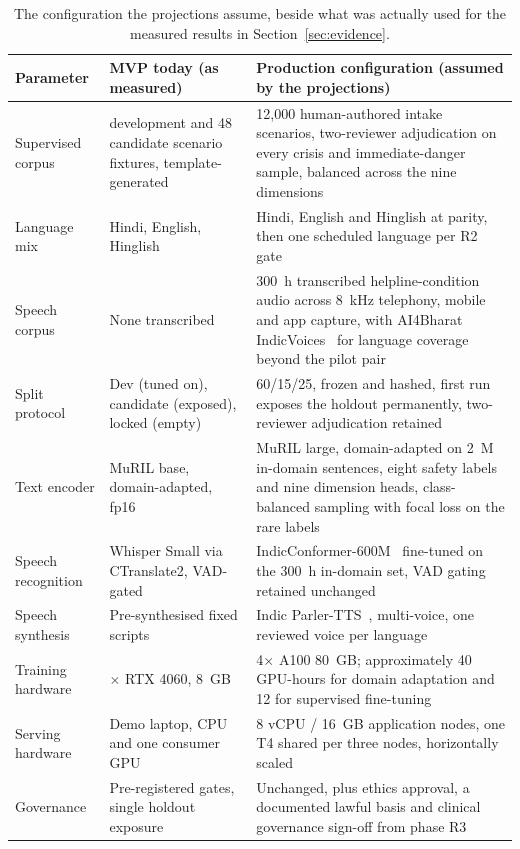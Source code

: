 \documentclass[11pt,a4paper]{article}
\begin{document}
\begin{table}[!htbp]
\centering\footnotesize
\caption{The configuration the projections assume, beside what was actually used for the measured
results in Section~\ref{sec:evidence}.}
\label{tab:trainconfig}
\begin{tabularx}{\linewidth}{@{}>{\raggedright\arraybackslash}p{2.9cm}>{\raggedright\arraybackslash}p{5.0cm}X@{}}
\toprule
Parameter & MVP today (as measured) & Production configuration (assumed by the projections) \\
\midrule
Supervised corpus & 57 development and 48 candidate scenario fixtures, template-generated &
12{,}000 human-authored intake scenarios, two-reviewer adjudication on every crisis and
immediate-danger sample, balanced across the nine dimensions \\
Language mix & Hindi, English, Hinglish & Hindi, English and Hinglish at parity, then one scheduled
language per R2 gate \\
Speech corpus & None transcribed & 300~h transcribed helpline-condition audio across 8~kHz
telephony, mobile and app capture, with AI4Bharat IndicVoices~\cite{indicvoices} for language
coverage beyond the pilot pair \\
Split protocol & Dev (tuned on), candidate (exposed), locked (empty) & 60/15/25, frozen and hashed,
first run exposes the holdout permanently, two-reviewer adjudication retained \\
Text encoder & MuRIL base, domain-adapted, fp16 & MuRIL large, domain-adapted on 2~M in-domain
sentences, eight safety labels and nine dimension heads, class-balanced sampling with focal loss on
the rare labels \\
Speech recognition & Whisper Small via CTranslate2, VAD-gated & IndicConformer-600M~\cite{indicconformer}
fine-tuned on the 300~h in-domain set, VAD gating retained unchanged \\
Speech synthesis & Pre-synthesised fixed scripts & Indic Parler-TTS~\cite{parlertts}, multi-voice,
one reviewed voice per language \\
Training hardware & 1$\times$ RTX 4060, 8~GB & 4$\times$ A100 80~GB; approximately 40 GPU-hours for
domain adaptation and 12 for supervised fine-tuning \\
Serving hardware & Demo laptop, CPU and one consumer GPU & 8 vCPU / 16~GB application nodes, one T4
shared per three nodes, horizontally scaled \\
Governance & Pre-registered gates, single holdout exposure & Unchanged, plus ethics approval, a
documented lawful basis and clinical governance sign-off from phase R3 \\
\bottomrule
\end{tabularx}
\end{table}
\end{document}
